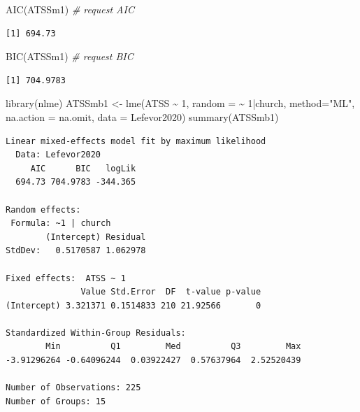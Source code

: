 \documentclass[
  11pt,
]{book}
\newenvironment{Shaded}{\begin{snugshade}}{\end{snugshade}}
\newcommand{\AttributeTok}[1]{\textcolor[rgb]{0.77,0.63,0.00}{#1}}
\newcommand{\CommentTok}[1]{\textcolor[rgb]{0.56,0.35,0.01}{\textit{#1}}}
\newcommand{\DecValTok}[1]{\textcolor[rgb]{0.00,0.00,0.81}{#1}}
\newcommand{\FunctionTok}[1]{\textcolor[rgb]{0.00,0.00,0.00}{#1}}
\newcommand{\NormalTok}[1]{#1}
\newcommand{\OtherTok}[1]{\textcolor[rgb]{0.56,0.35,0.01}{#1}}
\newcommand{\SpecialCharTok}[1]{\textcolor[rgb]{0.00,0.00,0.00}{#1}}
\newcommand{\StringTok}[1]{\textcolor[rgb]{0.31,0.60,0.02}{#1}}
\begin{document}
\begin{Shaded}
\begin{Highlighting}[]
\FunctionTok{AIC}\NormalTok{(ATSSm1) }\CommentTok{\# request AIC}
\end{Highlighting}
\end{Shaded}

\begin{verbatim}
[1] 694.73
\end{verbatim}

\begin{Shaded}
\begin{Highlighting}[]
\FunctionTok{BIC}\NormalTok{(ATSSm1) }\CommentTok{\# request BIC}
\end{Highlighting}
\end{Shaded}

\begin{verbatim}
[1] 704.9783
\end{verbatim}

\begin{Shaded}
\begin{Highlighting}[]
\FunctionTok{library}\NormalTok{(nlme)}
\NormalTok{ATSSmb1 }\OtherTok{\textless{}{-}} \FunctionTok{lme}\NormalTok{(ATSS }\SpecialCharTok{\textasciitilde{}} \DecValTok{1}\NormalTok{, }\AttributeTok{random =} \SpecialCharTok{\textasciitilde{}} \DecValTok{1}\SpecialCharTok{|}\NormalTok{church, }\AttributeTok{method=}\StringTok{"ML"}\NormalTok{, }\AttributeTok{na.action =}\NormalTok{ na.omit, }\AttributeTok{data =}\NormalTok{ Lefevor2020)}
\FunctionTok{summary}\NormalTok{(ATSSmb1)}
\end{Highlighting}
\end{Shaded}

\begin{verbatim}
Linear mixed-effects model fit by maximum likelihood
  Data: Lefevor2020 
     AIC      BIC   logLik
  694.73 704.9783 -344.365

Random effects:
 Formula: ~1 | church
        (Intercept) Residual
StdDev:   0.5170587 1.062978

Fixed effects:  ATSS ~ 1 
               Value Std.Error  DF  t-value p-value
(Intercept) 3.321371 0.1514833 210 21.92566       0

Standardized Within-Group Residuals:
        Min          Q1         Med          Q3         Max 
-3.91296264 -0.64096244  0.03922427  0.57637964  2.52520439 

Number of Observations: 225
Number of Groups: 15 
\end{verbatim}
\end{document}
